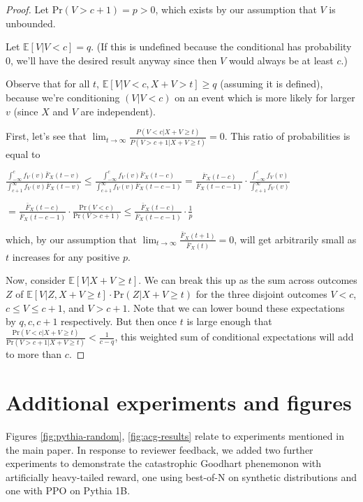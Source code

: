 \documentclass{article}
\begin{document}
\begin{proof}
Let \(\text{Pr}(V>c+1)=p>0\), which exists by our assumption that \(V\) is unbounded.

Let \(\mathbb E[V|V<c] = q\). (If this is undefined because the conditional has probability \(0\), we'll have the desired result anyway since then \(V\) would always be at least \(c\).) 

Observe that for all \(t\), \(\mathbb E[V|V<c, X+V>t] \ge q\) (assuming it is defined), because we're conditioning \((V|V<c)\) on an event which is more likely for larger \(v\) (since \(X\) and \(V\) are independent). 

First, let's see that \(\lim_{t\to\infty}\frac{P(V<c|X+V\ge t)}{P(V>c+1|X+V\ge t)}=0\). This ratio of probabilities is equal to

\(\frac{\int_{-\infty}^c f_V(v)\bar F_X(t-v)}{\int_{c+1}^\infty f_V(v)\bar F_X(t-v)} \le \frac{\int_{-\infty}^c f_V(v)\bar F_X(t-c)}{\int_{c+1}^\infty f_V(v)\bar F_X(t-c-1)} = \frac{\bar F_X(t-c)}{\bar F_X(t-c-1)}\cdot \frac{\int_{-\infty}^c f_V(v)}{\int_{c+1}^\infty f_V(v)}\)

\(=\frac{\bar F_X(t-c)}{\bar F_X(t-c-1)}\cdot \frac{\text{Pr}(V<c)}{\text{Pr}(V>c+1)}\le \frac{\bar F_X(t-c)}{\bar F_X(t-c-1)}\cdot \frac1p\)

which, by our assumption that \(\lim_{t\to\infty}\frac{\bar{F}_X(t+1)}{\bar{F}_X(t)}=0\), will get arbitrarily small as \(t\) increases for any positive \(p\).

Now, consider \(\mathbb E[V|X+V\ge t]\). We can break this up as the sum across outcomes \(Z\) of \(\mathbb E[V|Z,X+V\ge t]\cdot \text{Pr}(Z | X+V\ge t)\) for the three disjoint outcomes \(V<c\), \(c\le V\le c+1\), and \(V>c+1\). Note that we can lower bound these expectations by \(q, c, c+1\) respectively. But then once \(t\) is large enough that \(\frac{\text{Pr}(V<c|X+V\ge t)}{\text{Pr}(V>c+1|X+V\ge t)}<\frac1{c-q}\),  this weighted sum of conditional expectations will add to more than \(c\).
\end{proof}

\setcounter{figure}{0}
\setcounter{table}{0}
\section{Additional experiments and figures}

Figures \ref{fig:pythia-random}, \ref{fig:acg-results} relate to experiments mentioned in the main paper.
In response to reviewer feedback, we added two further experiments to demonstrate the catastrophic Goodhart phenemonon with artificially heavy-tailed reward, one using best-of-N on synthetic distributions and one with PPO on Pythia 1B.
\end{document}
